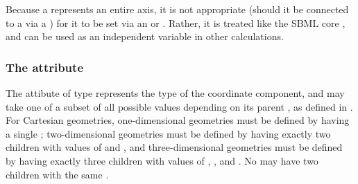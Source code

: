 Because a \CoordinateComponent represents an entire axis, it is not appropriate (should it be connected to a \Parameter via a \SpatialSymbolReference) for it to be set via an \InitialAssignment or \Rule.  Rather, it is treated like the SBML core  , and can be used as an independent variable in other calculations.

\subsubsection{The \fixttspace{} attribute}
The  attibute of type  represents the type of the coordinate component, and may take one of a subset of all possible  values depending on its parent \Geometry, as defined in .
For Cartesian geometries, one-dimensional geometries must be defined by having a single  \CoordinateComponent; two-dimensional geometries must be defined by having exactly two \CoordinateComponent children with  values of  and , and three-dimensional geometries must be defined by having exactly three \CoordinateComponent children with  values of , , and .  No \Geometry may have two \CoordinateComponent children with the same .

